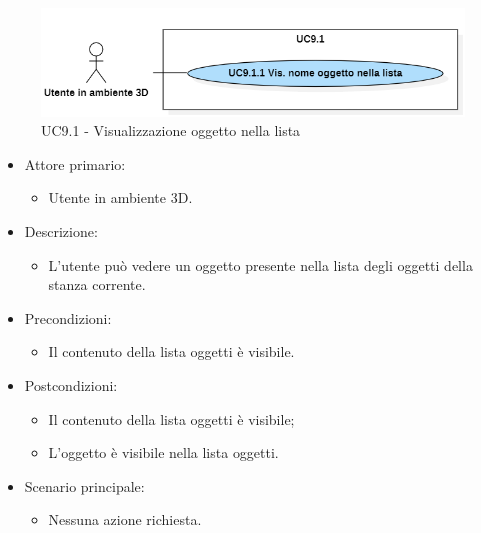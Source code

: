 \begin{figure}[H]
  \renewcommand{\thefigure}{10}
  \includegraphics[width=\linewidth]{./res/images/UC9.1.png}
  \caption{UC9.1 - Visualizzazione oggetto nella lista}
  \label{fig:UC 9.1}
\end{figure}

\begin{itemize}

	\item Attore primario: 
	\begin{itemize}
		\item Utente in ambiente 3D.
	\end{itemize}
	\item Descrizione:
	\begin{itemize}
		\item L'utente può vedere un oggetto presente nella lista degli oggetti della stanza corrente.
	\end{itemize}
	
	\item Precondizioni:
	\begin{itemize}
		\item Il contenuto della lista oggetti è visibile.
	\end{itemize}
	
	\item Postcondizioni:
	\begin{itemize}
		\item Il contenuto della lista oggetti è visibile;
		\item L'oggetto è visibile nella lista oggetti.
	\end{itemize}
	
	\item Scenario principale:
	\begin{itemize}
		\item Nessuna azione richiesta.
	\end{itemize}
	
\end{itemize}

